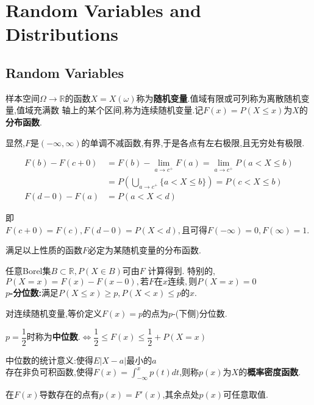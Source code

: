 \section{Random Variables and Distributions}
\subsection{Random Variables}
样本空间$ \Omega \rightarrow \mathbb{R}$的函数$ X = X(\omega)$称为\textbf{随机变量}.值域有限或可列称为离散随机变量,值域充满数
轴上的某个区间,称为连续随机变量.记$ F(x) = P(X \le x)$为$ X$的\textbf{分布函数}.

显然,$ F$是$ (-\infty, \infty)$的单调不减函数,有界,于是各点有左右极限,且无穷处有极限.

\begin{equation*}
	\begin{split}
		F(b) - F(c + 0) & = F(b) - \lim \limits_{a \to c^{+}} F(a) =\lim \limits_{a \to c^{+}}P(a < X \le b) \\
		                & = P(\bigcup_{a \to c^{+}}\{a < X \le b\}) = P(c < X \le b)                         \\
		F(d - 0) - F(a) & = P(a < X < d)
	\end{split}
\end{equation*}

即$ F(c + 0) = F(c), F(d - 0) = P(X<d), 且可得F(-\infty) = 0, F(\infty) = 1$.

满足以上性质的函数$ F$必定为某随机变量的分布函数.

任意Borel集$ B\subset \mathbb{R}, P(X \in B) 可由F$ 计算得到.
特别的,$ P(X=x) = F(x) - F(x - 0),若F在x连续,则P(X=x) = 0$
\\

\textbf{$p$-分位数:}满足$ P(X \le x) \ge p, P(X <x) \le p 的x. $

对连续随机变量,等价定义$F(x) = p$的点为$p$-(下侧)分位数.

$ p =\dfrac{1}{2}$时称为\textbf{中位数}.$\Leftrightarrow \dfrac{1}{2} \le F(x) \le \dfrac{1}{2} + P(X=x) $

中位数的统计意义:使得$E|X-a|$最小的$a$
\\

存在非负可积函数,使得$ F(x) = \int_{-\infty}^{x}{p(t)dt}$,则称$ p(x)$为$ X$的\textbf{概率密度函数}.

在$ F(x)$导数存在的点有$ p(x) = F'(x)$,其余点处$ p(x)$可任意取值.

